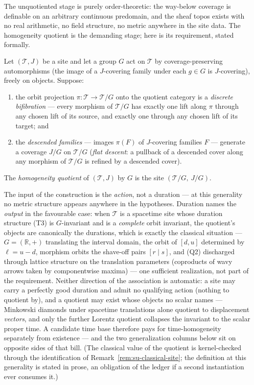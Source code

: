 The unquotiented stage is purely order-theoretic:
the way-below coverage is definable on an arbitrary continuous
predomain, and the sheaf topos exists with no real arithmetic, no
field structure, no metric anywhere in the site data. The homogeneity
quotient is the demanding stage; here is its requirement, stated
formally.

\begin{definition}\label{def:su-homogeneity-quotient}
Let $(\mathcal{T}, J)$ be a site and let a group $G$ act on
$\mathcal{T}$ by coverage-preserving automorphisms (the image of a
$J$-covering family under each $g \in G$ is $J$-covering), freely on
objects. Suppose:
\begin{enumerate}
\item[(Q1)] the orbit projection
  $\pi \colon \mathcal{T} \to \mathcal{T}/G$ onto the quotient
  category is a \emph{discrete bifibration} --- every morphism of
  $\mathcal{T}/G$ has exactly one lift along $\pi$ through any
  chosen lift of its source, and exactly one through any chosen lift
  of its target; and
\item[(Q2)] the \emph{descended families} --- images $\pi(F)$ of
  $J$-covering families $F$ --- generate a coverage $J/G$ on
  $\mathcal{T}/G$ (\emph{flat descent}: a pullback of a descended
  cover along any morphism of $\mathcal{T}/G$ is refined by a
  descended cover).
\end{enumerate}
The \emph{homogeneity quotient} of $(\mathcal{T}, J)$ by $G$ is the
site $(\mathcal{T}/G,\ J/G)$.
\end{definition}

The input of the construction is the \emph{action}, not a duration
--- at this generality no metric structure appears anywhere in the
hypotheses. Duration names the \emph{output} in the favourable case:
when $\mathcal{T}$ is a spacetime site whose duration structure (T3)
is $G$-invariant and is a \emph{complete} orbit invariant, the
quotient's objects are canonically the durations, which is exactly
the classical situation --- $G = (\mathbb{R}, +)$ translating the
interval domain, the orbit of $[d,u]$ determined by $\ell = u - d$,
morphism orbits the shave-off pairs $[r \mid s]$, and (Q2)
discharged through lattice structure on the translation parameters
(coproducts of wavy arrows taken by componentwise maxima) --- one
sufficient realization, not part of the requirement. Neither
direction of the association is automatic: a site may carry a
perfectly good duration and admit no qualifying action (nothing to
quotient by), and a quotient may exist whose objects no scalar
names --- Minkowski diamonds under spacetime translations alone
quotient to displacement \emph{vectors}, and only the further
Lorentz quotient collapses the invariant to the scalar proper time.
A candidate time base therefore pays for time-homogeneity separately
from existence --- and the two generalization columns below sit on
opposite sides of that bill. (The classical value of the quotient is
kernel-checked through the identification of
Remark~\ref{rem:su-classical-site}; the definition at this
generality is stated in prose, an obligation of the ledger if a
second instantiation ever consumes it.)

